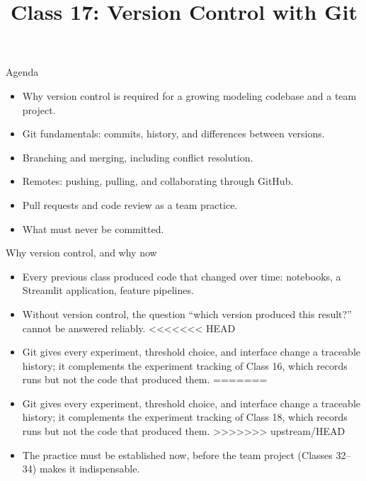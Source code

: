
\usepackage{amssymb}

\title{Class 17: Version Control with Git}
\author{\coursename}
\date{}



\frame{\titlepage \coursefooter}

\begin{frame}{Agenda}
\begin{itemize}
\item Why version control is required for a growing modeling codebase and a team project.
\item Git fundamentals: commits, history, and differences between versions.
\item Branching and merging, including conflict resolution.
\item Remotes: pushing, pulling, and collaborating through GitHub.
\item Pull requests and code review as a team practice.
\item What must never be committed.
\end{itemize}
\coursefooter
\end{frame}

\begin{frame}{Why version control, and why now}
\begin{itemize}
\item Every previous class produced code that changed over time: notebooks, a Streamlit application, feature pipelines.
\item Without version control, the question ``which version produced this result?'' cannot be answered reliably.
<<<<<<< HEAD
\item Git gives every experiment, threshold choice, and interface change a traceable history; it complements the experiment tracking of Class 16, which records runs but not the code that produced them.
=======
\item Git gives every experiment, threshold choice, and interface change a traceable history; it complements the experiment tracking of Class 18, which records runs but not the code that produced them.
>>>>>>> upstream/HEAD
\item The practice must be established now, before the team project (Classes 32--34) makes it indispensable.
\end{itemize}
\coursefooter
\end{frame}

